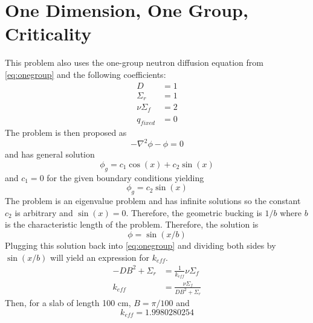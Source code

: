 \section{One Dimension, One Group, Criticality} \label{sc:onegroup1d}
  This problem also uses the one-group neutron diffusion equation from 
  \eqref{eq:onegroup} and the following coefficients:
  \begin{align*}
    D &= 1\\
    \Sigma_r &= 1\\
    \nu \Sigma_f &= 2\\
    q_{fixed} &= 0
  \end{align*}
  The problem is then proposed as 
  \begin{equation}
    -\nabla^2 \phi - \phi = 0 
  \end{equation}
  and has general solution
  \begin{equation}
    \phi_g = c_1 \cos(x) + c_2 \sin(x)
  \end{equation}
  and $c_1 = 0 $ for the given boundary conditions yielding
  \begin{equation} \label{eq:sinshape}
    \phi_g = c_2 \sin(x)
  \end{equation}
  The problem is an eigenvalue problem and has infinite solutions so the 
  constant $c_2$ is arbitrary and $\sin(x)=0$. Therefore, the geometric 
  bucking is $1/b$ where $b$ is the characteristic length of the problem. 
  Therefore, the solution is 
  \begin{equation} \label{eq:onedimensionsol}
    \phi = \sin(x/b)
  \end{equation}
  Plugging this solution back into \eqref{eq:onegroup} and dividing both sides
  by $\sin(x/b)$ will yield an expression for $k_{eff}$.
  \begin{align}
    -D B^2 + \Sigma_r &= \frac{1}{k_{eff}} \nu \Sigma_f \\
    k_{eff} &= \frac{\nu \Sigma_f}{DB^2 + \Sigma_r} \label{eq:keff1d}
  \end{align}
  Then, for a slab of length 100 cm, $B = \pi / 100$ and
  \[ k_{eff} = 1.9980280254 \]
